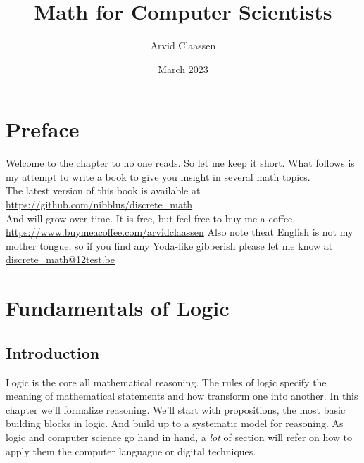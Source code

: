 \documentclass[10pt,a4paper,draft,titlepage,onecolumn]{book}
\author{Arvid Claassen}
\date{March 2023}
\title{Math for Computer Scientists}
\begin{document}
\maketitle
\tableofcontents
\chapter*{Preface}
Welcome to the chapter to no one reads. So let me keep it short.
What follows is my attempt to write a book to give you insight in several math topics. \\
The latest version of this book is available at \url{https://github.com/nibblus/discrete_math}\\ And will grow over time. 
It is free, but feel free to buy me a coffee.  \url{https://www.buymeacoffee.com/arvidclaassen}
Also note theat English is not my mother tongue, so if you find any Yoda-like gibberish please let me know at \url{discrete_math@12test.be}




\chapter{Fundamentals of Logic}
\section*{Introduction}
Logic is the core all mathematical reasoning. The rules of logic specify the meaning of mathematical statements and how transform one into another. 
In this chapter we'll formalize reasoning. 
We'll start with propositions, the most basic building blocks in logic. And build up to a systematic model for reasoning.
As logic and computer science go hand in hand, a \textit{lot} of section will refer on how to apply them the computer languague or digital techniques.
\end{document}
